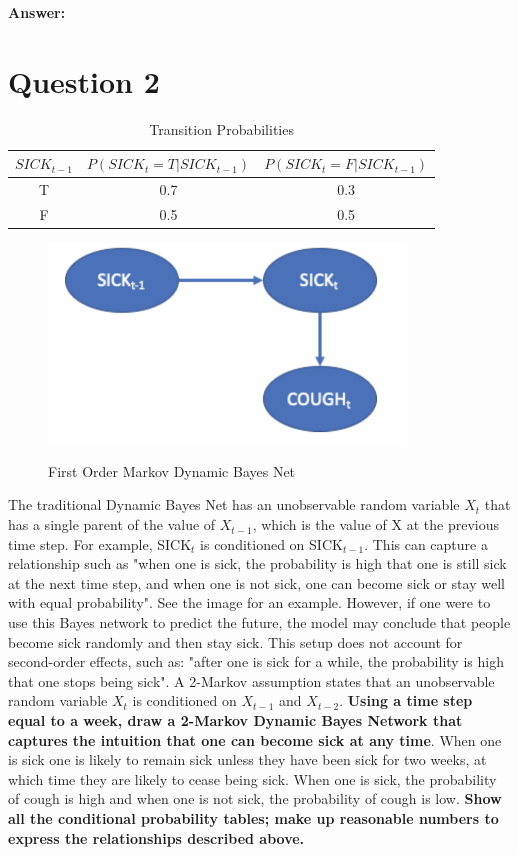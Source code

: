 \documentclass[12pt]{article}
\begin{document}
\noindent\textbf{Answer:}

\newpage


\section*{Question 2}

\begin{table}[h]
    \centering
    \begin{tabular}{|c|c|c|}
    \hline
        \textbf{$SICK_{t-1}$} & $P(SICK_{t}=T | SICK_{t-1})$ & $P(SICK_t=F | SICK_{t-1})$ \\
        \hline
        T & 0.7 & 0.3 \\
        \hline
        F & 0.5 & 0.5 \\
        \hline
    \end{tabular}
    \caption{Transition Probabilities}
    \label{tab:my_label}
\end{table}
\begin{figure}[htp]
    \includegraphics[width=9.5cm, center]{img/P3Q2Bayes.png}
    \label{fig:bayes}
    \caption{First Order Markov Dynamic Bayes Net}
\end{figure}
The traditional Dynamic Bayes Net has an unobservable random variable $X_t$ that 
has a single parent of the value of $X_{t-1}$, which is the value of X at the 
previous time step. For example, SICK$_t$ is conditioned on SICK$_{t-1}$. This can 
capture a relationship such as "when one is sick, the probability is high that one 
is still sick at the next time step, and when one is not sick, one can become sick 
or stay well with equal probability". See the image for an example. However, if one
were to use this Bayes network to predict the future, the model may conclude that 
people become sick randomly and then stay sick. This setup does not account for 
second-order effects, such as: "after one is sick for a while, the probability is 
high that one stops being sick". A 2-Markov assumption states that an unobservable 
random variable $X_t$ is conditioned on $X_{t-1}$ and $X_{t-2}$. \textbf{Using a
time step equal to a week, draw a 2-Markov Dynamic Bayes Network
that captures the intuition that one can become sick at any time}. When 
one is sick one is likely to remain sick unless they have been sick for two weeks, 
at which time they are likely to cease being sick. When one is sick, the 
probability of cough is high and when one is not sick, the probability of cough is 
low. \textbf{Show all the conditional probability tables; 
make up reasonable numbers to express the relationships 
described above.} \\
\end{document}
